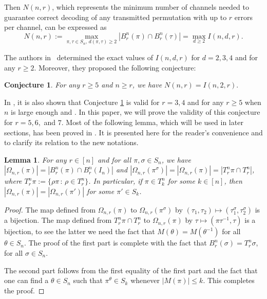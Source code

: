 \documentclass{amsart}
\newtheorem{con}[thm]{Conjecture}
\newtheorem{lem}[thm]{Lemma}
\numberwithin{equation}{section}
\begin{document}
Then  $N(n,r)$, which represents the minimum number of channels needed to guarantee correct decoding of any transmitted permutation with up to $r$ errors per channel, can be expressed as
\[
N(n,r) := \max_{\pi, \tau \in S_n,\, d(\pi,\tau)\ge 2} |B_r^n(\pi) \cap B_r^n(\tau)| 
= \max_{d \ge 2} I(n,d,r).
\]


The authors in~\cite{WFK} determined the exact values of $I(n,d,r)$ for $d = 2,3,4$ and for any $r \ge 2$. Moreover, they proposed the following conjecture:
\begin{con}\cite{WFK}\label{con}
For any $r \ge 5$ and $n \ge r$, we have
$
N(n,r) = I(n,2,r).
$
\end{con}

In \cite{WFK}, it is also shown that  Conjecture \ref{con} is valid for $r = 3, 4$ and for any $r \ge 5$ when $n$ is large enough \cite[Theorem 9]{WFK} and \cite[Lemma 3]{WFK}. In this paper, we will prove the validity of this conjecture for $r = 5, 6, $ and $7$. Most of the following lemma, which will be used in later sections, has been proved in  \cite[Lemma 7]{WK}. It is presented here for the reader’s convenience and to clarify its relation to the new notations.
\begin{lem}\label{lme6}
For any $r\in [n]$ and for all $\pi,\sigma \in S_n$, we have $|\Omega_{n,r}(\pi)|=|B_r^n(\pi)\cap B_r^n(I_n)|$ and 
 $|\Omega_{n,r}(\pi^\sigma)|=|\Omega_{n,r}(\pi)|=|T_r^n \pi \cap T_r^n|$, where $T_r^n \pi:=\{\rho\pi\,:\, \rho \in T_r^n\}$.
In particular, if $\pi \in T_k^n$ for some $k\in [n]$, then $|\Omega_{n,r}(\pi)|=|\Omega_{n,r}(\pi')|$ for some $\pi' \in S_k$. 
\end{lem}
\begin{proof}
The map defined from $\Omega_{n,r}(\pi)$ to $\Omega_{n,r}(\pi^\sigma)$ by $(\tau_1,\tau_2)\mapsto (\tau_1^\sigma,\tau_2^\sigma)$ is a bijection. The map defined from 
$T_r^n \pi \cap T_r^n$ to $\Omega_{n,r}(\pi)$ by $\tau \mapsto (\pi \tau^{-1},\tau)$ is a bijection, to see the latter we need the fact that $M(\theta)=M(\theta^{-1})$ for all $\theta \in S_n$. The proof of the first part is complete with the fact that $B_r^n(\sigma)=T_r^n \sigma$, for all $\sigma \in S_n$. 

The second part follows from the first equality of the first part and the fact that one can find a $\theta \in S_n$ such that $\pi^\theta \in S_k$ whenever $|M(\pi)|\leq k$. This completes the proof.
\end{proof}
\end{document}
